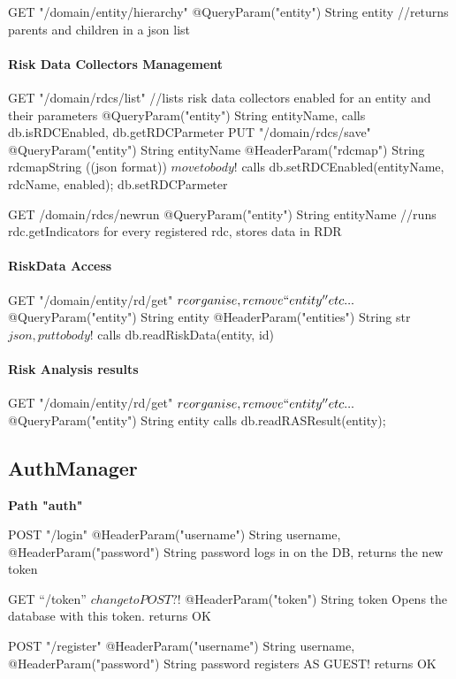 	GET "/{domain}/entity/hierarchy"
	  @QueryParam("entity") String entity
	  //returns parents and children in a json list
	
\paragraph{Risk Data Collectors Management} 
  GET "/{domain}/rdcs/list"  //lists risk data collectors enabled for an entity and their parameters
	@QueryParam("entity") String entityName,
	  calls db.isRDCEnabled, db.getRDCParmeter
   PUT "/{domain}/rdcs/save"
      @QueryParam("entity") String entityName
      @HeaderParam("rdcmap") String rdcmapString  ((json format)) $move to body!$
        calls db.setRDCEnabled(entityName, rdcName, enabled); db.setRDCParmeter
    
    GET /{domain}/rdcs/newrun
	  @QueryParam("entity") String entityName
	  //runs rdc.getIndicators for every registered rdc, stores data in RDR	  
	  
	  
\paragraph{RiskData Access} 
	GET "/{domain}/entity/rd/get" $reorganise, remove ``entity'' etc...$
	  @QueryParam("entity") String entity
	  @HeaderParam("entities") String str  $json, put to body!$
	  calls db.readRiskData(entity, id)
	  
\paragraph{Risk Analysis results} 
	GET "/{domain}/entity/rd/get" $reorganise, remove ``entity'' etc...$
	  @QueryParam("entity") String entity
	  calls db.readRASResult(entity);

\subsection{AuthManager}

\textbf{Path "auth"}

      POST "/login"
	@HeaderParam("username") String username, 
	@HeaderParam("password") String password
	logs in on the DB,
	returns the new token
	
	GET ``/token''  $ change to POST?!$
	@HeaderParam("token") String token
	Opens the database with this token.
	returns OK
	
	POST "/register"
	@HeaderParam("username") String username, 
	@HeaderParam("password") String password
	registers AS GUEST! 
	returns OK
	
